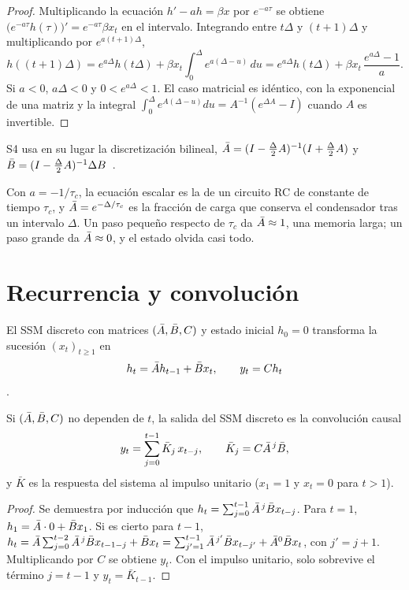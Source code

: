 \begin{proof}
Multiplicando la ecuación $h'-ah=\beta x$ por $e^{-a\tau}$ se obtiene $\bigl(e^{-a\tau}h(\tau)\bigr)'=e^{-a\tau}\beta x_t$ en el intervalo. Integrando entre $t\Delta$ y $(t+1)\Delta$ y multiplicando por $e^{a(t+1)\Delta}$,
\[
h((t+1)\Delta)=e^{a\Delta}h(t\Delta)+\beta x_t\int_{0}^{\Delta}e^{a(\Delta-u)}\,du=e^{a\Delta}h(t\Delta)+\beta x_t\,\frac{e^{a\Delta}-1}{a}.
\]
Si $a<0$, $a\Delta<0$ y $0<e^{a\Delta}<1$. El caso matricial es idéntico, con la exponencial de una matriz y la integral $\int_0^{\Delta}e^{A(\Delta-u)}du=A^{-1}(e^{\Delta A}-I)$ cuando $A$ es invertible.
\end{proof}

S4 usa en su lugar la discretización bilineal, $\bar{A}=(I-\frac\Delta2A)^{-1}(I+\frac\Delta2A)$ y $\bar{B}=(I-\frac\Delta2A)^{-1}\Delta B$~\cite[§2.3]{s4}.

\begin{observacion}
Con $a=-1/\tau_{c}$, la ecuación escalar es la de un circuito RC de constante de tiempo $\tau_{c}$, y $\bar{A}=e^{-\Delta/\tau_{c}}$ es la fracción de carga que conserva el condensador tras un intervalo $\Delta$. Un paso pequeño respecto de $\tau_{c}$ da $\bar{A}\approx 1$, una memoria larga; un paso grande da $\bar{A}\approx 0$, y el estado olvida casi todo.
\end{observacion}

\section{Recurrencia y convolución}

\begin{definicion}\label{def:ssmdiscreto}
El SSM discreto con matrices $(\bar{A},\bar{B},C)$ y estado inicial $h_0=0$ transforma la sucesión $(x_t)_{t\ge1}$ en
\[
h_t=\bar{A} h_{t-1}+\bar{B} x_t,\qquad y_t=Ch_t
\]
\cite[ecs.~2a y~2b]{mamba}.
\end{definicion}

\begin{proposicion}\label{prop:conv}
Si $(\bar{A},\bar{B},C)$ no dependen de $t$, la salida del SSM discreto es la convolución causal
\[
y_t=\sum_{j=0}^{t-1}\bar K_j\,x_{t-j},\qquad \bar K_j=C\bar{A}^{\,j}\bar{B},
\]
y $\bar K$ es la respuesta del sistema al impulso unitario ($x_1=1$ y $x_t=0$ para $t>1$).
\end{proposicion}

\begin{proof}
Se demuestra por inducción que $h_t=\sum_{j=0}^{t-1}\bar{A}^{\,j}\bar{B} x_{t-j}$. Para $t=1$, $h_1=\bar{A}\cdot 0+\bar{B} x_1$. Si es cierto para $t-1$, $h_t=\bar{A}\sum_{j=0}^{t-2}\bar{A}^{\,j}\bar{B} x_{t-1-j}+\bar{B} x_t=\sum_{j'=1}^{t-1}\bar{A}^{\,j'}\bar{B} x_{t-j'}+\bar{A}^{0}\bar{B} x_t$, con $j'=j+1$. Multiplicando por $C$ se obtiene $y_t$. Con el impulso unitario, solo sobrevive el término $j=t-1$ y $y_t=\bar K_{t-1}$.
\end{proof}

